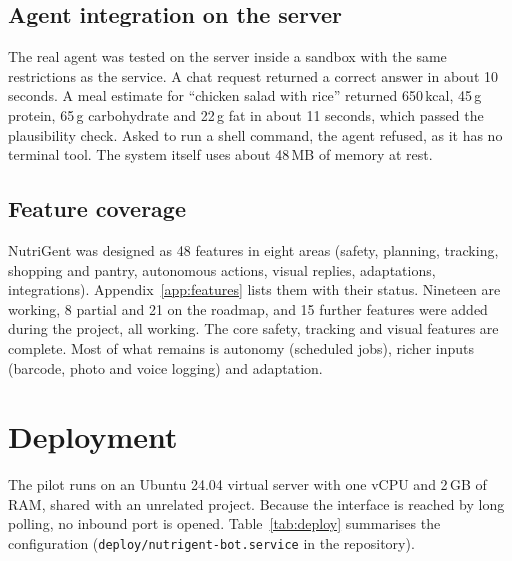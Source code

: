 \documentclass[11pt,a4paper]{article}
\begin{document}
\subsection{Agent integration on the server}

The real agent was tested on the server inside a sandbox with the same restrictions as the service. A
chat request returned a correct answer in about 10 seconds. A meal estimate for ``chicken salad with
rice'' returned 650\,kcal, 45\,g protein, 65\,g carbohydrate and 22\,g fat in about 11 seconds, which
passed the plausibility check. Asked to run a shell command, the agent refused, as it has no terminal
tool. The system itself uses about 48\,MB of memory at rest.

\subsection{Feature coverage}

NutriGent was designed as 48 features in eight areas (safety, planning, tracking, shopping and pantry,
autonomous actions, visual replies, adaptations, integrations). Appendix~\ref{app:features} lists them
with their status. Nineteen are working, 8 partial and 21 on the roadmap, and 15 further features were
added during the project, all working. The core safety, tracking and visual features are complete. Most
of what remains is autonomy (scheduled jobs), richer inputs (barcode, photo and voice logging) and
adaptation.

\section{Deployment}\label{sec:deploy}

The pilot runs on an Ubuntu 24.04 virtual server with one vCPU and 2\,GB of RAM, shared with an
unrelated project. Because the interface is reached by long polling, no inbound port is opened.
Table~\ref{tab:deploy} summarises the configuration (\texttt{deploy/nutrigent-bot.service} in the
repository).
\end{document}
